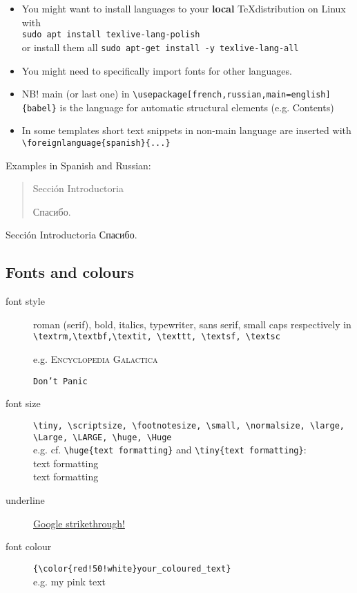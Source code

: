 \documentclass[a4paper,11pt,leqno]{article}
\begin{document}
\begin{itemize}
	\item You might want to install languages to your \textbf{local} \TeX distribution on Linux with \\ \verb|sudo apt install texlive-lang-polish| \\
	or install them all \verb|sudo apt-get install -y texlive-lang-all|

	\item You might need to specifically import fonts for other languages.
	\item NB! main (or last one) in \verb|\usepackage[french,russian,main=english]{babel}| is the language for automatic structural elements (e.g. Contents)
	\item In some templates short text snippets in non-main language are inserted with
	\verb|\foreignlanguage{spanish}{...}| 
\end{itemize}

Examples in Spanish and Russian:

\begin{center}
	\begin{quote}
		\foreignlanguage{spanish}{Sección Introductoria} 
		
		\foreignlanguage{russian}{Спасибо.}
	\end{quote}
	
	Sección Introductoria
	Спасибо.
\end{center}

\subsection{Fonts and colours}

\begin{description}
	\item[font style] roman (serif), bold, italics, typewriter, sans serif, small caps respectively in \\
	\verb|\textrm,\textbf,\textit, \texttt, \textsf, \textsc|
	
	e.g. \textsc{Encyclopedia Galactica} 
	
	\texttt{Don't Panic}
	
	\item[font size] \verb|\tiny, \scriptsize, \footnotesize, \small, \normalsize, \large, \Large, \LARGE, \huge, \Huge| \\
	e.g. cf. \verb|\huge{text formatting}| and \verb|\tiny{text formatting}|: \\
	\huge{text formatting} \\
	\tiny{text formatting}
	\normalsize
	
	\item[underline] \underline{Google strikethrough!}
	
	\item[font colour] \verb|{\color{red!50!white}your_coloured_text}| \\
	 e.g. {\color{red!50!white}my pink text}
 
\end{description}
\end{document}
